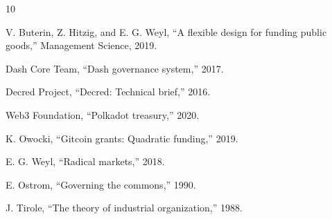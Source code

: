 \documentclass[11pt,a4paper]{article}
\begin{document}

\begin{thebibliography}{10}

V. Buterin, Z. Hitzig, and E. G. Weyl, ``A flexible design for funding public goods,'' Management Science, 2019.

Dash Core Team, ``Dash governance system,'' 2017.

Decred Project, ``Decred: Technical brief,'' 2016.

Web3 Foundation, ``Polkadot treasury,'' 2020.

K. Owocki, ``Gitcoin grants: Quadratic funding,'' 2019.

E. G. Weyl, ``Radical markets,'' 2018.

E. Ostrom, ``Governing the commons,'' 1990.

J. Tirole, ``The theory of industrial organization,'' 1988.

\end{thebibliography}
\end{document}
